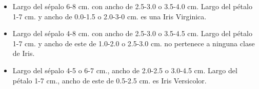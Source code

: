 \documentclass[a4paper,10pt]{article}
\begin{document}
\begin{itemize}
 \item Largo del sépalo 6-8 cm. con ancho de 2.5-3.0 o 3.5-4.0 cm. Largo del pétalo 1-7 cm. y ancho de 0.0-1.5 o 2.0-3-0 cm. es una Iris Virginica.
 \item Largo del sépalo 4-8 cm. con ancho de 2.5-3.0 o 3.5-4.5 cm. Largo del pétalo 1-7 cm. y ancho de este de 1.0-2.0 o 2.5-3.0 cm. no pertenece a ninguna clase de Iris.
 \item Largo del sépalo 4-5 o 6-7 cm., ancho de 2.0-2.5 o 3.0-4.5 cm. Largo del pétalo 1-7 cm., ancho de este de 0.5-2.5 cm. es Iris Versicolor.
\end{itemize}
\end{document}
